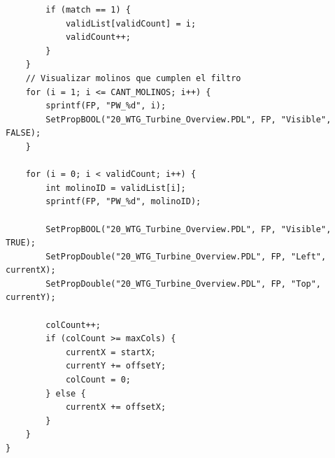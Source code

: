 \begin{lstlisting}
        if (match == 1) {
            validList[validCount] = i;
            validCount++;
        }
    }
    // Visualizar molinos que cumplen el filtro
    for (i = 1; i <= CANT_MOLINOS; i++) {
        sprintf(FP, "PW_%d", i);
        SetPropBOOL("20_WTG_Turbine_Overview.PDL", FP, "Visible", FALSE);
    }

    for (i = 0; i < validCount; i++) {
        int molinoID = validList[i];
        sprintf(FP, "PW_%d", molinoID);

        SetPropBOOL("20_WTG_Turbine_Overview.PDL", FP, "Visible", TRUE);
        SetPropDouble("20_WTG_Turbine_Overview.PDL", FP, "Left", currentX);
        SetPropDouble("20_WTG_Turbine_Overview.PDL", FP, "Top", currentY);

        colCount++;
        if (colCount >= maxCols) {
            currentX = startX;
            currentY += offsetY;
            colCount = 0;
        } else {
            currentX += offsetX;
        }
    }
}
\end{lstlisting}
